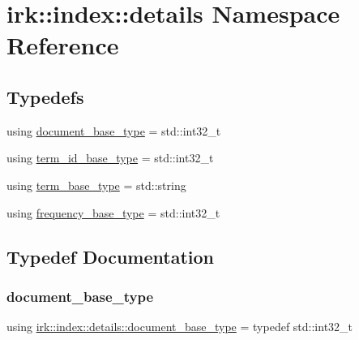 \hypertarget{namespaceirk_1_1index_1_1details}{}\section{irk\+:\+:index\+:\+:details Namespace Reference}
\label{namespaceirk_1_1index_1_1details}
\subsection*{Typedefs}
\begin{DoxyCompactItemize}
\item 
using \mbox{\hyperlink{namespaceirk_1_1index_1_1details_a2a13af82c5a304ec713fb875d59a5603}{document\+\_\+base\+\_\+type}} = std\+::int32\+\_\+t
\item 
using \mbox{\hyperlink{namespaceirk_1_1index_1_1details_a03b015c00fec26f2586208453b6e99ba}{term\+\_\+id\+\_\+base\+\_\+type}} = std\+::int32\+\_\+t
\item 
using \mbox{\hyperlink{namespaceirk_1_1index_1_1details_ae85cb57d6db703cac1c9eb5af11a03f2}{term\+\_\+base\+\_\+type}} = std\+::string
\item 
using \mbox{\hyperlink{namespaceirk_1_1index_1_1details_a4b657cb7a568be2f216aeb3eaff9e71b}{frequency\+\_\+base\+\_\+type}} = std\+::int32\+\_\+t
\end{DoxyCompactItemize}


\subsection{Typedef Documentation}
\mbox{\label{namespaceirk_1_1index_1_1details_a2a13af82c5a304ec713fb875d59a5603}} 
\subsubsection{\texorpdfstring{document\+\_\+base\+\_\+type}{document\_base\_type}}
{\footnotesize\ttfamily using \mbox{\hyperlink{namespaceirk_1_1index_1_1details_a2a13af82c5a304ec713fb875d59a5603}{irk\+::index\+::details\+::document\+\_\+base\+\_\+type}} = typedef std\+::int32\+\_\+t}

\mbox{\label{namespaceirk_1_1index_1_1details_a4b657cb7a568be2f216aeb3eaff9e71b}} 
